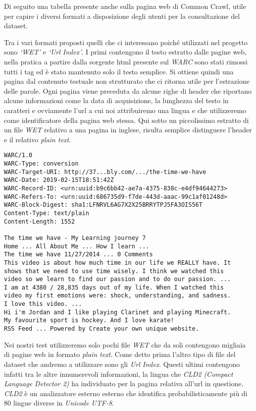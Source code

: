 \documentclass{article}
\newcommand{\CC}{Common Crawl}
\newcommand{\pt}{\textit{plain text}}
\begin{document}
Di seguito una tabella presente anche sulla pagina web di \CC{}, utile per capire i diversi formati a disposizione degli utenti per la consultazione del dataset.

\commonCrawlFilesTable

Tra i vari formati proposti quelli che ci interessano poiché utilizzati nel progetto sono \textit{`WET'} e \textit{`Url Index'}. I primi contengono il testo estratto dalle pagine web, nella pratica a partire dalla sorgente html presente sul \textit{WARC} sono stati rimossi tutti i tag ed è stato mantenuto solo il testo semplice. Si ottiene quindi una pagina dal contenuto testuale non strutturato che ci ritorna utile per l'estrazione delle parole. Ogni pagina viene preceduta da alcune righe di header che riportano alcune informazioni come la data di acquisizione, la lunghezza del testo in caratteri e ovviamente l'url a cui noi attribuiremo una lingua e che utilizzeremo come identificatore della pagina web stessa. Qui sotto un piccolissimo estratto di un file \textit{WET} relativo a una pagina in inglese, risulta semplice distinguere l'header e il relativo \pt{}.

\begin{verbatim}
WARC/1.0
WARC-Type: conversion
WARC-Target-URI: http://37...bly.com/.../the-time-we-have
WARC-Date: 2019-02-15T18:51:42Z
WARC-Record-ID: <urn:uuid:b9c6bb42-ae7a-4375-838c-e4df94644273>
WARC-Refers-To: <urn:uuid:686735d9-f7de-443d-aaac-99c1af01248d>
WARC-Block-Digest: sha1:LFNRVL6AG7X2X25BRRYTPJ5FA3OIS56T
Content-Type: text/plain
Content-Length: 1552

The time we have - My Learning journey 7
Home ... All About Me ... How I learn ...
The time we have 11/27/2014 ... 0 Comments
This video is about how much time in our life we REALLY have. It 
shows that we need to use time wisely. I think we watched this 
video so we learn to find our passion and to do our passion. ...
I am at 4380 / 28,835 days out of my life. When I watched this 
video my first emotions were: shock, understanding, and sadness. 
I love this video. ...
Hi i'm Jordan and I like playing Clarinet and playing Minecraft. 
My favourite sport is hockey. And I love karate!
RSS Feed ... Powered by Create your own unique website.
\end{verbatim}

Nei nostri test utilizzeremo solo pochi file \textit{WET} che da soli contengono migliaia di pagine web in formato \pt{}. Come detto prima l'altro tipo di file del dataset che andremo a utilizzare sono gli \textit{Url Index}. Questi ultimi contengono infatti tra le altre innumerevoli informazioni, la lingua che  \textit{CLD2 (Compact Language Detector 2)} ha individuato per la pagina relativa all'url in questione. \textit{CLD2} è un analizzatore esterno esterno che identifica probabilisticamente più di 80 lingue diverse in \textit{Unicode UTF-8}.
\end{document}
